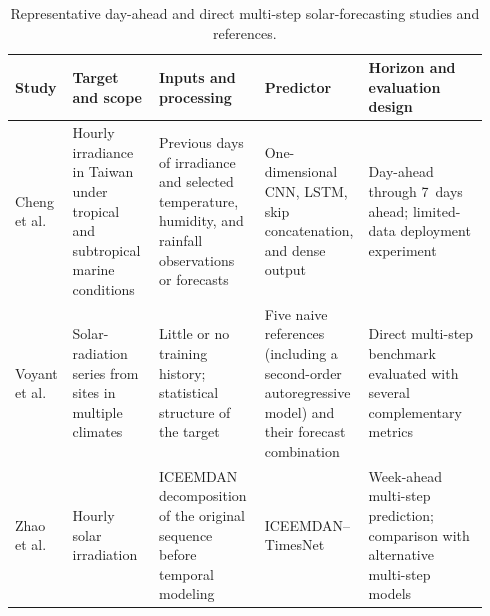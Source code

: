 \begin{table}[!t]
\centering
\caption{Representative day-ahead and direct multi-step solar-forecasting
studies and references.}
\label{tab:literature_review_multistep}
\scriptsize
\setlength{\tabcolsep}{2.5pt}
\renewcommand{\arraystretch}{1.12}
\begin{tabular}{@{}p{0.11\linewidth}p{0.18\linewidth}p{0.22\linewidth}p{0.18\linewidth}p{0.25\linewidth}@{}}
\toprule
\textbf{Study} & \textbf{Target and scope} & \textbf{Inputs and processing} &
\textbf{Predictor} & \textbf{Horizon and evaluation design} \\
\midrule
Cheng et al.\ \cite{cheng2021} &
Hourly irradiance in Taiwan under tropical and subtropical marine conditions &
Previous days of irradiance and selected temperature, humidity, and rainfall observations or forecasts &
One-dimensional CNN, LSTM, skip concatenation, and dense output &
Day-ahead through 7~days ahead; limited-data deployment experiment \\

Voyant et al.\ \cite{voyant2022} &
Solar-radiation series from sites in multiple climates &
Little or no training history; statistical structure of the target &
Five naive references (including a second-order autoregressive model) and their forecast combination &
Direct multi-step benchmark evaluated with several complementary metrics \\

Zhao et al.\ \cite{zhao2024timesnet} &
Hourly solar irradiation &
ICEEMDAN decomposition of the original sequence before temporal modeling &
ICEEMDAN--TimesNet &
Week-ahead multi-step prediction; comparison with alternative multi-step models \\
\bottomrule
\end{tabular}
\end{table}

